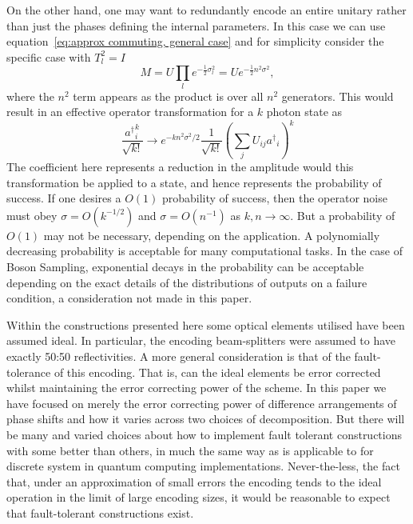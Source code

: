 \documentclass[aps,pra,twocolumn,superscriptaddress,numerical,floatfix]{revtex4-1}
\begin{document}
On the other hand, one may want to redundantly encode an entire unitary rather than just the phases defining the internal parameters.  In this case we can use equation~\ref{eq:approx commuting, general case} and for simplicity consider the specific case with $T_l^2= I$
\begin{equation}
	M = U \prod_l e^{-\frac{1}{2}\sigma_l^2} = U e^{-\frac{1}{2} n^2 \sigma^2},
\end{equation}
where the $n^2$ term appears as the product is over all $n^2$ generators.
This would result in an effective operator transformation for a $k$ photon state as
\begin{equation}
	\frac{{a^\dagger}_i^{k}}{\sqrt{k!}} \rightarrow 
	e^{-k n^2 \sigma^2/2} \frac{1}{\sqrt{k!}} \left(\sum_j U_{ij} {a^\dagger}_i \right)^k
\end{equation}
The coefficient here represents a reduction in the amplitude would this transformation be applied to a state, and hence represents the probability of success. If one desires a $O(1)$ probability of success, then the operator noise must obey $\sigma = O(k^{-1/2})$ and $\sigma = O(n^{-1})$ as $k,n \rightarrow \infty$.   But a probability of $O(1)$ may not be necessary, depending on the application.  A polynomially decreasing probability is acceptable for many computational tasks. In the case of Boson Sampling, exponential decays in the probability can be acceptable depending on the exact details of the distributions of outputs on a failure condition, a consideration not made in this paper.

Within the constructions presented here some optical elements utilised have been assumed ideal.  In particular, the encoding beam-splitters were assumed to have exactly 50:50 reflectivities.  A more general consideration is that of the fault-tolerance of this encoding.  That is, can the ideal elements be error corrected whilst maintaining the error correcting power of the scheme.   In this paper we have focused on merely the error correcting power of difference arrangements of phase shifts and how it varies across two choices of decomposition.  But there will be many and varied choices about how to implement fault tolerant constructions with some better than others, in much the same way as is applicable to for discrete system in quantum computing implementations.  Never-the-less, the fact that, under an approximation of small errors the encoding tends to the ideal operation in the limit of large encoding sizes, it would be reasonable to expect that fault-tolerant constructions exist.  
\end{document}
